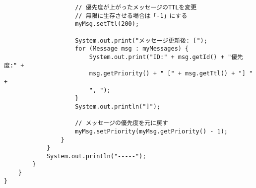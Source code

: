 \documentclass[11pt]{icsthesis}
\begin{document}
\begin{framed}
\begin{verbatim}
                    // 優先度が上がったメッセージのTTLを変更
                    // 無限に生存させる場合は「-1」にする
                    myMsg.setTtl(200);

                    System.out.print("メッセージ更新後: [");
                    for (Message msg : myMessages) {
                        System.out.print("ID:" + msg.getId() + "優先度:" + 
                        msg.getPriority() + " [" + msg.getTtl() + "] " + 
                        ", ");
                    }
                    System.out.println("]");  

                    // メッセージの優先度を元に戻す  
                    myMsg.setPriority(myMsg.getPriority() - 1);
                }
            }
            System.out.println("-----");
        }
    }
}
\end{verbatim}
\end{framed}
\end{document}

